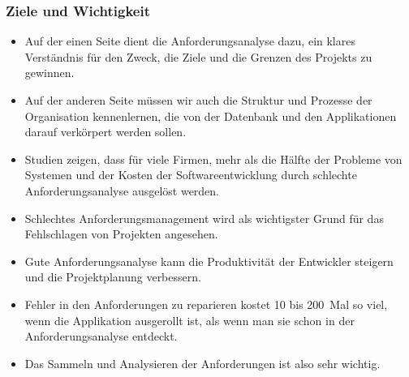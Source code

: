 \documentclass[aspectratio=169,mathserif,notheorems]{beamer}%
\begin{document}
\begin{frame}%
\frametitle{Ziele und Wichtigkeit}%
\begin{itemize}%
\item Auf der einen Seite dient die Anforderungsanalyse dazu, ein klares Verständnis für den Zweck, die Ziele und die Grenzen des Projekts zu gewinnen.%
%
\item<2-> Auf der anderen Seite müssen wir auch die Struktur und Prozesse der Organisation kennenlernen, die von der Datenbank und den Applikationen darauf verkörpert werden sollen.%
%
\item<3-> Studien zeigen, dass für viele Firmen, mehr als die Hälfte der Probleme von Systemen\cite{S2003ISA6P:RDARS} und der Kosten der Softwareentwicklung\cite{IC2009BAB2TPTS} durch schlechte Anforderungsanalyse ausgelöst werden.%
%
\item<4-> Schlechtes Anforderungsmanagement wird als wichtigster Grund für das Fehlschlagen von Projekten angesehen\cite{EDN2005RUIFACI}.%
%
\item<5-> Gute Anforderungsanalyse kann die Produktivität der Entwickler steigern und die Projektplanung verbessern\cite{DCVP2005READSDFFAC}.%
%
\item<6-> Fehler in den Anforderungen zu reparieren kostet 10 bis 200~Mal so viel, wenn die Applikation ausgerollt ist, als wenn man sie schon in der Anforderungsanalyse entdeckt\cite{BP1988UACSC,M2001FTEAOOP,RGJ2023EASARBFSAR}.%
%
\item<7-> Das Sammeln und Analysieren der Anforderungen ist also sehr wichtig.%
\end{itemize}%
\end{frame}%
%
\end{document}
